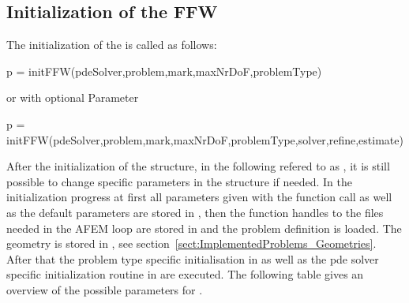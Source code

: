 \subsection{Initialization of the FFW}
\label{sect:QuickStart:Initialization}

\noindent
The initialization of the \FFW\! is called as follows:
\begin{pcode}
p = initFFW(pdeSolver,problem,mark,maxNrDoF,problemType)
\end{pcode}
or with optional Parameter
\begin{pcode}
p = initFFW(pdeSolver,problem,mark,maxNrDoF,problemType,solver,refine,estimate)
\end{pcode}

\noindent
After the initialization of the structure, in the following refered to as , it is still possible to 
change specific parameters in the structure if needed.
In the initialization progress at first all parameters given with the function call as well as the default parameters
are stored in , then the function handles to the files needed in the AFEM loop are
stored in  and the problem definition is loaded. The geometry is stored in , see section~\ref{sect:ImplementedProblems_Geometries}. After that the problem type specific initialisation in  as well as the pde solver specific initialization routine in 
 are executed. The following table gives an overview 
of the possible parameters for .\bigskip


